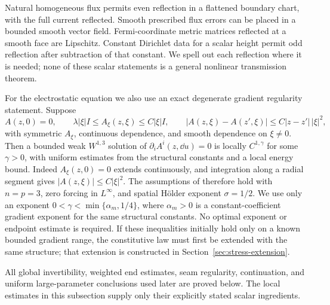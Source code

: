Natural homogeneous flux permits even reflection in a flattened
boundary chart, with the full current reflected. Smooth prescribed
flux errors can be placed in a bounded smooth vector field.
Fermi-coordinate metric matrices reflected at a smooth face are
Lipschitz. Constant Dirichlet data for a scalar height permit odd
reflection after subtraction of that constant. We spell out each
reflection where it is needed; none of these scalar statements is a
general nonlinear transmission theorem.

For the electrostatic equation we also use an exact degenerate
gradient regularity statement. Suppose
\[
 A(z,0)=0,\qquad
 \lambda|\xi|I\le A_\xi(z,\xi)\le C|\xi|I,
 \qquad
 |A(z,\xi)-A(z',\xi)|\le C|z-z'|\,|\xi|^2,
\]
with symmetric $A_\xi$, continuous dependence, and smooth dependence
on $\xi\ne0$. Then a bounded weak $W^{1,3}$ solution of
$\partial_iA^i(z,\dd u)=0$ is locally $C^{1,\gamma}$ for some
$\gamma>0$, with uniform estimates from the structural constants
and a local energy bound. Indeed $A_\xi(z,0)=0$ extends continuously,
and integration along a radial segment gives $|A(z,\xi)|\le C|\xi|^2$.
The assumptions of \citet[Theorem 1.1, (1.5)--(1.8)]{AraujoZhang2020}
therefore hold with $n=p=3$, zero forcing in $L^\infty$, and spatial
H\"older exponent $\sigma=1/2$.  We use only an exponent
$0<\gamma<\min\{\alpha_m,1/4\}$, where $\alpha_m>0$ is a
constant-coefficient gradient exponent for the same structural constants.
No optimal exponent or endpoint estimate is required.
If these inequalities initially hold only on a known
bounded gradient range, the constitutive law must first be extended
with the same structure; that extension is constructed in
Section~\ref{sec:stress-extension}.

All global invertibility, weighted end estimates, seam regularity,
continuation, and uniform large-parameter conclusions used later are
proved below. The local estimates in this subsection supply only
their explicitly stated scalar ingredients.
